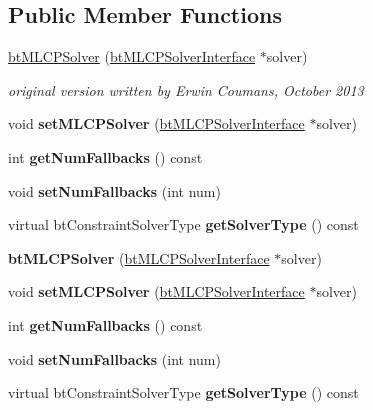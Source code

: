 \subsection*{Public Member Functions}
\begin{DoxyCompactItemize}
\item 
\mbox{\label{classbtMLCPSolver_ac699f0a59f0b730ac39658ee2903b042}} 
\hyperlink{classbtMLCPSolver_ac699f0a59f0b730ac39658ee2903b042}{bt\+M\+L\+C\+P\+Solver} (\hyperlink{classbtMLCPSolverInterface}{bt\+M\+L\+C\+P\+Solver\+Interface} $\ast$solver)
\begin{DoxyCompactList}\small\item\em original version written by Erwin Coumans, October 2013 \end{DoxyCompactList}\item 
\mbox{\label{classbtMLCPSolver_af5a0ef252391a313ba85f871b47710b0}} 
void {\bfseries set\+M\+L\+C\+P\+Solver} (\hyperlink{classbtMLCPSolverInterface}{bt\+M\+L\+C\+P\+Solver\+Interface} $\ast$solver)
\item 
\mbox{\label{classbtMLCPSolver_acad09cfe41fe66c3fe1cb418f3ffb390}} 
int {\bfseries get\+Num\+Fallbacks} () const
\item 
\mbox{\label{classbtMLCPSolver_ada02127142fb8e8028833d73a9341bfa}} 
void {\bfseries set\+Num\+Fallbacks} (int num)
\item 
\mbox{\label{classbtMLCPSolver_aeba65f41f71a01b893c116491d454b77}} 
virtual bt\+Constraint\+Solver\+Type {\bfseries get\+Solver\+Type} () const
\item 
\mbox{\label{classbtMLCPSolver_ac699f0a59f0b730ac39658ee2903b042}} 
{\bfseries bt\+M\+L\+C\+P\+Solver} (\hyperlink{classbtMLCPSolverInterface}{bt\+M\+L\+C\+P\+Solver\+Interface} $\ast$solver)
\item 
\mbox{\label{classbtMLCPSolver_af5a0ef252391a313ba85f871b47710b0}} 
void {\bfseries set\+M\+L\+C\+P\+Solver} (\hyperlink{classbtMLCPSolverInterface}{bt\+M\+L\+C\+P\+Solver\+Interface} $\ast$solver)
\item 
\mbox{\label{classbtMLCPSolver_acad09cfe41fe66c3fe1cb418f3ffb390}} 
int {\bfseries get\+Num\+Fallbacks} () const
\item 
\mbox{\label{classbtMLCPSolver_ada02127142fb8e8028833d73a9341bfa}} 
void {\bfseries set\+Num\+Fallbacks} (int num)
\item 
\mbox{\label{classbtMLCPSolver_aeba65f41f71a01b893c116491d454b77}} 
virtual bt\+Constraint\+Solver\+Type {\bfseries get\+Solver\+Type} () const
\end{DoxyCompactItemize}
